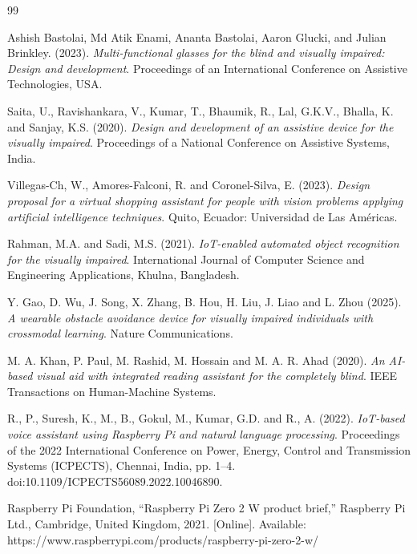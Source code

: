 \newpage
\begin{thebibliography}{99}

Ashish Bastolai, Md Atik Enami, Ananta Bastolai, Aaron Glucki, and Julian Brinkley. (2023).
\textit{Multi-functional glasses for the blind and visually impaired: Design and development}.
Proceedings of an International Conference on Assistive Technologies, USA.

Saita, U., Ravishankara, V., Kumar, T., Bhaumik, R., Lal, G.K.V., Bhalla, K. and Sanjay, K.S. (2020).
\textit{Design and development of an assistive device for the visually impaired}.
Proceedings of a National Conference on Assistive Systems, India.

Villegas-Ch, W., Amores-Falconi, R. and Coronel-Silva, E. (2023).
\textit{Design proposal for a virtual shopping assistant for people with vision problems applying artificial intelligence techniques}.
Quito, Ecuador: Universidad de Las Américas.

Rahman, M.A. and Sadi, M.S. (2021).
\textit{IoT-enabled automated object recognition for the visually impaired}.
International Journal of Computer Science and Engineering Applications,
Khulna, Bangladesh.

Y. Gao, D. Wu, J. Song, X. Zhang, B. Hou, H. Liu, J. Liao and L. Zhou (2025).
\textit{A wearable obstacle avoidance device for visually impaired individuals with crossmodal learning}.
Nature Communications.

M. A. Khan, P. Paul, M. Rashid, M. Hossain and M. A. R. Ahad (2020).
\textit{An AI-based visual aid with integrated reading assistant for the completely blind}.
IEEE Transactions on Human-Machine Systems.

R., P., Suresh, K., M., B., Gokul, M., Kumar, G.D. and R., A. (2022).
\textit{IoT-based voice assistant using Raspberry Pi and natural language processing}.
Proceedings of the 2022 International Conference on Power, Energy, Control and Transmission Systems (ICPECTS),
Chennai, India, pp. 1--4.
doi:10.1109/ICPECTS56089.2022.10046890.



Raspberry Pi Foundation,
``Raspberry Pi Zero 2 W product brief,''
Raspberry Pi Ltd., Cambridge, United Kingdom, 2021.
[Online]. Available: https://www.raspberrypi.com/products/raspberry-pi-zero-2-w/


\end{thebibliography}
